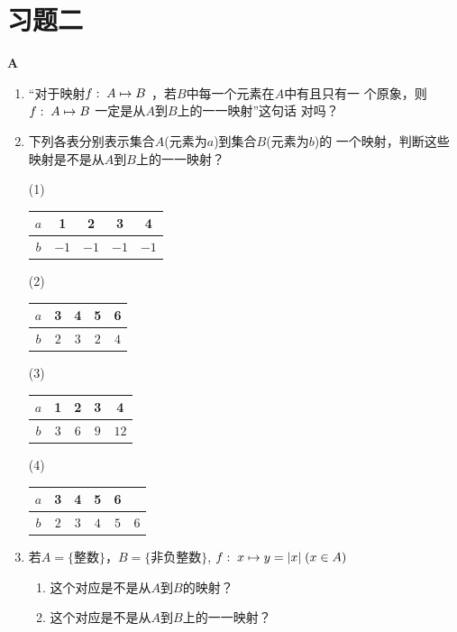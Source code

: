 \section*{习题二}
\begin{center}
    \bfseries A
\end{center}

\begin{enumerate}
    \item “对于映射$f:\; A\mapsto B$
    ，若$B$中每一个元素在$A$中有且只有一
    个原象，则$f:\; A\mapsto B$
    一定是从$A$到$B$上的一一映射”这句话
    对吗？
    \item 下列各表分别表示集合$A$(元素为$a$)到集合$B$(元素为$b$)的
    一个映射，判断这些映射是不是从$A$到$B$上的一一映射？
\begin{multicols}{2}
(1) \begin{tabular}{|c|c|c|c|c|}
\hline
    $a$&1&2&3&4\\
    \hline
$b$&$-1$&$-1$&$-1$&$-1$\\
\hline
\end{tabular}

(2) \begin{tabular}{|c|c|c|c|c|}
    \hline
        $a$&3&4&5&6\\
        \hline
    $b$&$2$&$3$&$2$&$4$\\
    \hline
    \end{tabular}

(3) \begin{tabular}{|c|c|c|c|c|}
    \hline
        $a$&1&2&3&4\\
        \hline
    $b$&$3$&$6$&$9$&$12$\\
    \hline
    \end{tabular}

(4) \begin{tabular}{|c|c|c|c|c|c|}
    \hline
        $a$&3&4&5&6\\
        \hline
    $b$&$2$&$3$&$4$&$5$&6\\
    \hline
    \end{tabular}
\end{multicols}

\item 若$A=\{\text{整数}\}$，$B=\{\text{非负整数}\}$, $f:\; x\mapsto y=|x|\; (x\in A)$
\begin{enumerate}[(1)]
    \item 这个对应是不是从$A$到$B$的映射？
    \item 这个对应是不是从$A$到$B$上的一一映射？
\end{enumerate}
\end{enumerate}

